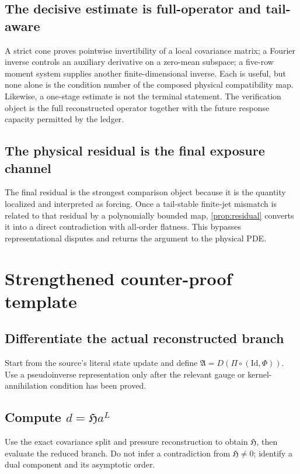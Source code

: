 \documentclass[12pt]{article}
\theoremstyle{plain}
\theoremstyle{definition}
\theoremstyle{remark}
\newcommand{\Id}{\mathrm{Id}}
\newcommand{\Comp}{\mathfrak A}
\newcommand{\Hidden}{\mathfrak H}
\newcommand{\Obs}{\Pi}
\begin{document}
\subsection{The decisive estimate is full-operator and tail-aware}
A strict cone proves pointwise invertibility of a local covariance matrix; a Fourier inverse controls an auxiliary derivative on a zero-mean subspace; a five-row moment system supplies another finite-dimensional inverse. Each is useful, but none alone is the condition number of the composed physical compatibility map. Likewise, a one-stage estimate is not the terminal statement. The verification object is the full reconstructed operator together with the future response capacity permitted by the ledger.

\subsection{The physical residual is the final exposure channel}
The final residual is the strongest comparison object because it is the quantity localized and interpreted as forcing. Once a tail-stable finite-jet mismatch is related to that residual by a polynomially bounded map, \cref{prop:residual} converts it into a direct contradiction with all-order flatness. This bypasses representational disputes and returns the argument to the physical PDE.

\section{Strengthened counter-proof template}\label{sec:template}
\subsection{Differentiate the actual reconstructed branch}
Start from the source's literal state update and define \(\Comp=D(\Obs\circ(\Id,\Phi))\). Use a pseudoinverse representation only after the relevant gauge or kernel-annihilation condition has been proved.

\subsection{Compute \texorpdfstring{\(d=\Hidden a^L\)}{the exact reduced-branch defect}}
Use the exact covariance split and pressure reconstruction to obtain \(\Hidden\), then evaluate the reduced branch. Do not infer a contradiction from \(\Hidden\neq0\); identify a dual component and its asymptotic order.
\end{document}
